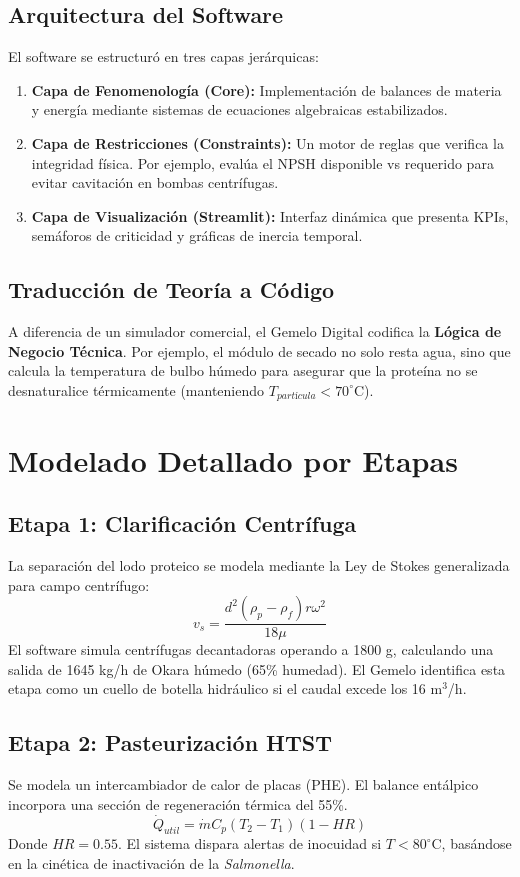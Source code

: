 \documentclass[12pt,a4paper,twocolumn]{article}
\begin{document}
\subsection{Arquitectura del Software}
El software se estructuró en tres capas jerárquicas:
\begin{enumerate}
    \item \textbf{Capa de Fenomenología (Core):} Implementación de balances de materia y energía mediante sistemas de ecuaciones algebraicas estabilizados.
    \item \textbf{Capa de Restricciones (Constraints):} Un motor de reglas que verifica la integridad física. Por ejemplo, evalúa el NPSH disponible vs requerido para evitar cavitación en bombas centrífugas.
    \item \textbf{Capa de Visualización (Streamlit):} Interfaz dinámica que presenta KPIs, semáforos de criticidad y gráficas de inercia temporal.
\end{enumerate}

\subsection{Traducción de Teoría a Código}
A diferencia de un simulador comercial, el Gemelo Digital codifica la \textbf{Lógica de Negocio Técnica}. Por ejemplo, el módulo de secado no solo resta agua, sino que calcula la temperatura de bulbo húmedo para asegurar que la proteína no se desnaturalice térmicamente (manteniendo $T_{partícula} < 70^\circ$C).

\section{Modelado Detallado por Etapas}

\subsection{Etapa 1: Clarificación Centrífuga}
La separación del lodo proteico se modela mediante la Ley de Stokes generalizada para campo centrífugo:
\begin{equation}
    v_s = \frac{d^2 (\rho_p - \rho_f) r \omega^2}{18 \mu}
\end{equation}
El software simula centrífugas decantadoras operando a 1800 g, calculando una salida de 1645 kg/h de Okara húmedo (65\% humedad). El Gemelo identifica esta etapa como un cuello de botella hidráulico si el caudal excede los 16 m$^3$/h.

\subsection{Etapa 2: Pasteurización HTST}
Se modela un intercambiador de calor de placas (PHE). El balance entálpico incorpora una sección de regeneración térmica del 55\%.
\begin{equation}
    \dot{Q}_{util} = \dot{m} C_p (T_2 - T_1) (1 - HR)
\end{equation}
Donde $HR = 0.55$. El sistema dispara alertas de inocuidad si $T < 80^\circ$C, basándose en la cinética de inactivación de la \textit{Salmonella}.
\end{document}
